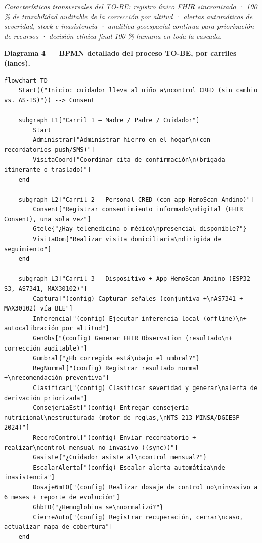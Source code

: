 \documentclass[11pt,a4paper]{article}
\begin{document}
\emph{Características transversales del TO-BE: registro único FHIR sincronizado · 100 \% de trazabilidad auditable de la corrección por altitud · alertas automáticas de severidad, stock e inasistencia · analítica geoespacial continua para priorización de recursos · decisión clínica final 100 \% humana en toda la cascada.}

\textbf{Diagrama 4 --- BPMN detallado del proceso TO-BE, por carriles (lanes).}

\begin{samepage}\begin{verbatim}
flowchart TD
    Start(("Inicio: cuidador lleva al niño a\ncontrol CRED (sin cambio vs. AS-IS)")) --> Consent

    subgraph L1["Carril 1 — Madre / Padre / Cuidador"]
        Start
        Administrar["Administrar hierro en el hogar\n(con recordatorios push/SMS)"]
        VisitaCoord["Coordinar cita de confirmación\n(brigada itinerante o traslado)"]
    end

    subgraph L2["Carril 2 — Personal CRED (con app HemoScan Andino)"]
        Consent["Registrar consentimiento informado\ndigital (FHIR Consent), una sola vez"]
        Gtele{"¿Hay telemedicina o médico\npresencial disponible?"}
        VisitaDom["Realizar visita domiciliaria\ndirigida de seguimiento"]
    end

    subgraph L3["Carril 3 — Dispositivo + App HemoScan Andino (ESP32-S3, AS7341, MAX30102)"]
        Captura["(config) Capturar señales (conjuntiva +\nAS7341 + MAX30102) vía BLE"]
        Inferencia["(config) Ejecutar inferencia local (offline)\n+ autocalibración por altitud"]
        GenObs["(config) Generar FHIR Observation (resultado\n+ corrección auditable)"]
        Gumbral{"¿Hb corregida está\nbajo el umbral?"}
        RegNormal["(config) Registrar resultado normal +\nrecomendación preventiva"]
        Clasificar["(config) Clasificar severidad y generar\nalerta de derivación priorizada"]
        ConsejeriaEst["(config) Entregar consejería nutricional\nestructurada (motor de reglas,\nNTS 213-MINSA/DGIESP-2024)"]
        RecordControl["(config) Enviar recordatorio + realizar\ncontrol mensual no invasivo ((sync))"]
        Gasiste{"¿Cuidador asiste al\ncontrol mensual?"}
        EscalarAlerta["(config) Escalar alerta automática\nde inasistencia"]
        Dosaje6mTO["(config) Realizar dosaje de control no\ninvasivo a 6 meses + reporte de evolución"]
        GhbTO{"¿Hemoglobina se\nnormalizó?"}
        CierreAuto["(config) Registrar recuperación, cerrar\ncaso, actualizar mapa de cobertura"]
    end


\end{verbatim}
\end{samepage}
\end{document}
